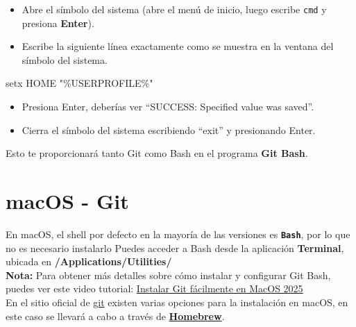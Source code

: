 \documentclass[
  spanish,
  12pt,
  letterpaper,
  DIV=11,
  numbers=noendperiod]{scrreprt}
\newenvironment{Shaded}{\begin{snugshade}}{\end{snugshade}}
\newcommand{\ExtensionTok}[1]{\textcolor[rgb]{0.00,0.23,0.31}{#1}}
\newcommand{\NormalTok}[1]{\textcolor[rgb]{0.00,0.23,0.31}{#1}}
\newcommand{\StringTok}[1]{\textcolor[rgb]{0.13,0.47,0.30}{#1}}
\providecommand{\tightlist}{%
  \setlength{\itemsep}{0pt}\setlength{\parskip}{0pt}}
\begin{document}
\begin{itemize}
\tightlist
\item
  Abre el símbolo del sistema (abre el menú de inicio, luego escribe
  \texttt{cmd} y presiona \textbf{Enter}).
\item
  Escribe la siguiente línea exactamente como se muestra en la ventana
  del símbolo del sistema.
\end{itemize}

\begin{Shaded}
\begin{Highlighting}[]
\ExtensionTok{setx}\NormalTok{ HOME }\StringTok{"\%USERPROFILE\%"}
\end{Highlighting}
\end{Shaded}

\begin{itemize}
\tightlist
\item
  Presiona Enter, deberías ver ``SUCCESS: Specified value was saved''.
\item
  Cierra el símbolo del sistema escribiendo ``exit'' y presionando
  Enter.
\end{itemize}

Esto te proporcionará tanto Git como Bash en el programa \textbf{Git
Bash}.

\section{macOS - Git}\label{macos---git}

En macOS, el shell por defecto en la mayoría de las versiones es
\textbf{\texttt{Bash}}, por lo que no es necesario instalarlo Puedes
acceder a Bash desde la aplicación \textbf{Terminal}, ubicada en
\textbf{/Applications/Utilities/}\\

\textbf{Nota:} Para obtener más detalles sobre cómo instalar y
configurar Git Bash, puedes ver este video tutorial:
\href{https://www.youtube.com/watch?v=kdM9YOX2hZ0}{Instalar Git
fácilmente en MacOS 2025}\\

En el sitio oficial de \href{https://git-scm.com/install/mac}{git}
existen varias opciones para la instalación en macOS, en este caso se
llevará a cabo a través de \href{https://brew.sh/}{\textbf{Homebrew}}.
\end{document}
